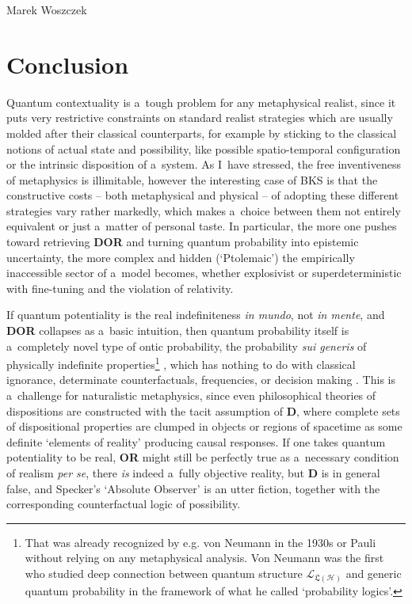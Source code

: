 \begin{artengenv}{Marek Woszczek}
\section{Conclusion}
Quantum contextuality is a~tough problem for any metaphysical realist, since it puts very restrictive constraints on standard realist strategies which are usually molded after their classical counterparts, for example by sticking to the classical notions of actual state and possibility, like possible spatio-temporal configuration or the intrinsic disposition of a~system. As I~have stressed, the free inventiveness of metaphysics is illimitable, however the interesting case of BKS is that the constructive costs -- both metaphysical and physical -- of adopting these different strategies vary rather markedly, which makes a~choice between them not entirely equivalent or just a~matter of personal taste. In particular, the more one pushes toward retrieving \textbf{DOR} and turning quantum probability into epistemic uncertainty, the more complex and hidden (‘Ptolemaic') the empirically inaccessible sector of a~model becomes, whether explosivist or superdeterministic with fine-tuning and the violation of relativity.

If quantum potentiality is the real indefiniteness \textit{in mundo}, not \textit{in mente}, and \textbf{DOR} collapses as a~basic intuition, then quantum probability itself is a~completely novel type of ontic probability, the probability \textit{sui generis} of physically indefinite properties\footnote{That was already recognized by e.g. von Neumann in the 1930s
\parencite[][pp.196–197]{taub_quantum_1962} %
 or Pauli 
\parencite*[][]{pauli_probability_1994} %
 without relying on any metaphysical analysis. Von Neumann was the first who studied deep connection between quantum structure $\mathcal{L}_{\bm{\mathfrak{L}}(\mathcal{H})}$ and generic quantum probability in the framework of what he called ‘probability logics'.} , which has nothing to do with classical ignorance, determinate counterfactuals, frequencies, or decision making 
\parencite[][]{barnum_quantum_2000}. %
 This is a~challenge for naturalistic metaphysics, since even philosophical theories of dispositions are constructed with the tacit assumption of \textbf{D}, where complete sets of dispositional properties are clumped in objects or regions of spacetime as some definite ‘elements of reality' producing causal responses. If one takes quantum potentiality to be real, \textbf{OR} might still be perfectly true as a~necessary condition of realism \textit{per se}, there \textit{is} indeed a~fully objective reality, but \textbf{D} is in general false, and Specker's ‘Absolute Observer' is an utter fiction, together with the corresponding counterfactual logic of possibility.


\end{artengenv}
